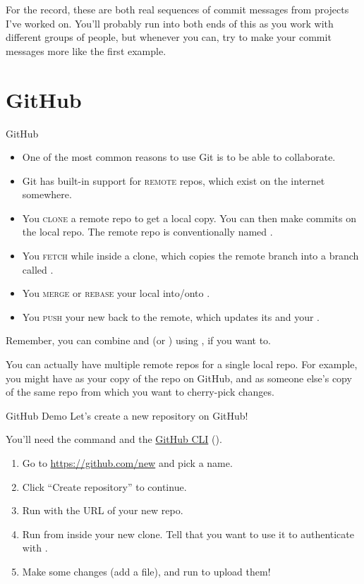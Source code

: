 For the record, these are both real sequences of commit messages from projects
I've worked on.  You'll probably run into both ends of this as you work with
different groups of people, but whenever you can, try to make your commit
messages more like the first example.

\section{GitHub}
\begin{frame}{GitHub}
  \begin{itemize}
    \item One of the most common reasons to use Git is to be able to
      collaborate.\pause
    \item Git has built-in support for \textsc{remote} repos, which exist on
      the internet somewhere.\pause
    \item You \textsc{clone} a remote repo to get a local copy.  You can then
      make commits on the local repo.  The remote repo is conventionally named
      .\pause
    \item You \textsc{fetch} while inside a clone, which copies the remote
       branch into a branch called .\pause
    \item You \textsc{merge} or \textsc{rebase} your local  into/onto
      .\pause
    \item You \textsc{push} your new  back to the remote,
      which updates its  and your .
  \end{itemize}
\end{frame}

Remember, you can combine  and  (or ) using
, if you want to.

You can actually have multiple remote repos for a single local repo.  For
example, you might have  as your copy of the repo on GitHub, and
 as someone else's copy of the same repo from which you want to
cherry-pick changes.

\begin{frame}{GitHub Demo}
  Let's create a new repository on GitHub!

  You'll need the  command and the
  \href{https://cli.github.com}{GitHub CLI} ().

  \begin{enumerate}
    \item Go to \url{https://github.com/new} and pick a name.
    \item Click \enquote{Create repository} to continue.
    \item Run  with the URL of your new repo.
    \item Run  from inside your new clone.  Tell 
      that you want to use it to authenticate with .
    \item Make some changes (add a file), and run  to upload them!
  \end{enumerate}
\end{frame}

